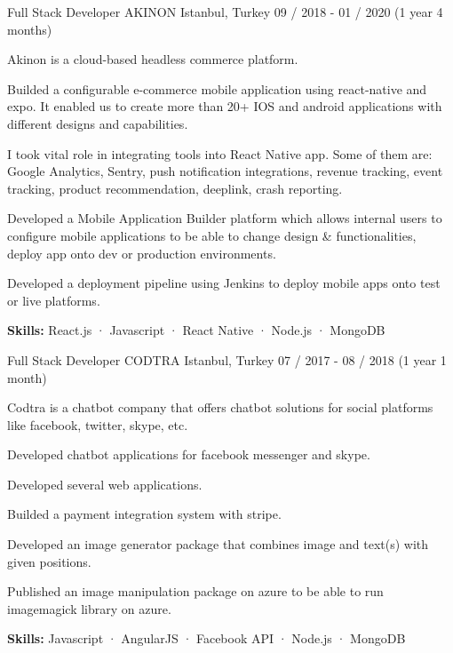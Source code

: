 \begin{cventries}
  \cventry
    {Full Stack Developer} %
    {AKINON} %
    {Istanbul, Turkey} %
    {09 / 2018 - 01 / 2020 (1 year 4 months)}
    {
      \begin{cvitems} %
        \item {Akinon is a cloud-based headless commerce platform.}
        \item {Builded a configurable e-commerce mobile application using react-native and expo. It enabled us to create more than 20+ IOS and android applications with different designs and capabilities.}
        \item {I took vital role in integrating tools into React Native app. Some of them are: Google Analytics, Sentry, push notification integrations, revenue tracking, event tracking, product recommendation, deeplink, crash reporting.}
        \item {Developed a Mobile Application Builder platform which allows internal users to configure mobile applications to be able to change design {\&} functionalities, deploy app onto dev or production environments.}
        \item {Developed a deployment pipeline using Jenkins to deploy mobile apps onto test or live platforms.}
        \item {\textbf {Skills:} React.js · Javascript · React Native · Node.js · MongoDB}
      \end{cvitems}
    }

  \cventry
    {Full Stack Developer} %
    {CODTRA} %
    {Istanbul, Turkey} %
    {07 / 2017 - 08 / 2018 (1 year 1 month)}
    {
      \begin{cvitems} %
        \item {Codtra is a chatbot company that offers chatbot solutions for social platforms like facebook, twitter, skype, etc.}
        \item {Developed chatbot applications for facebook messenger and skype.}
        \item {Developed several web applications.}
        \item {Builded a payment integration system with stripe.}
        \item {Developed an image generator package that combines image and text(s) with given positions.}
        \item {Published an image manipulation package on azure to be able to run imagemagick library on azure.}
        \item {\textbf {Skills:} Javascript · AngularJS · Facebook API · Node.js · MongoDB}
      \end{cvitems}
    }


\end{cventries}

